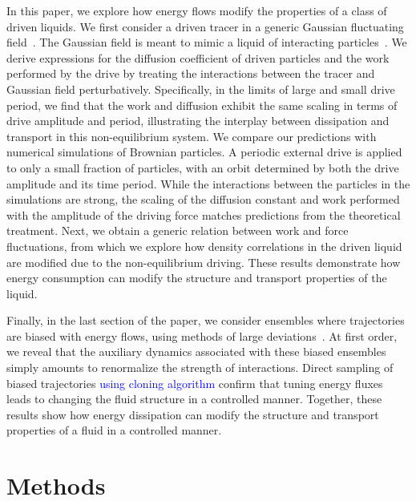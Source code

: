 \documentclass[pre, superscriptaddress, twocolumn,pre]{revtex4-1}
\begin{document}
In this paper, we explore how energy flows modify the properties of a class of driven liquids. We first consider a driven tracer in a generic Gaussian fluctuating field~\cite{Chandler1993, Dean1996, Demery2014, Kruger2017}. The Gaussian field  is meant to mimic a liquid of interacting particles~\cite{Chandler1993}. We derive expressions for the diffusion coefficient of driven particles and the work performed by the drive by treating the interactions between the tracer and Gaussian field perturbatively. Specifically, in the limits of large and small drive period, we find that the work and diffusion exhibit the same scaling in terms of drive amplitude and period, illustrating the interplay between dissipation and transport in this non-equilibrium system. We compare our predictions with numerical simulations of Brownian particles. A periodic external drive is applied to only a small fraction of particles, with an orbit determined by both the drive amplitude and its time period. While the interactions between the particles in the simulations are strong, the scaling of the diffusion constant and work performed with the amplitude of the driving force matches predictions from the theoretical treatment. Next, we obtain a generic relation between work and force fluctuations, from which we explore how density correlations in the driven liquid are modified due to the non-equilibrium driving. These results demonstrate how energy consumption can modify the structure and transport properties of the liquid. 

Finally, in the last section of the paper, we consider ensembles where trajectories are biased with energy flows, using methods of large deviations~\cite{Chetrite2013, Jack2010}. At first order, we reveal that the auxiliary dynamics associated with these biased ensembles simply amounts to renormalize the strength of interactions. Direct sampling of biased trajectories \textcolor{blue}{using cloning algorithm \cite{Giadina2006,tailleur2007probing,Hurtado2009,Nemoto2016,Ray2018,Klymko2018,Brewer2018}} confirm that tuning energy fluxes leads to changing the fluid structure in a controlled manner. Together, these results show how energy dissipation can modify the structure and transport properties of a fluid in a controlled manner. 




\section{Methods}\label{sec:method}
\end{document}
